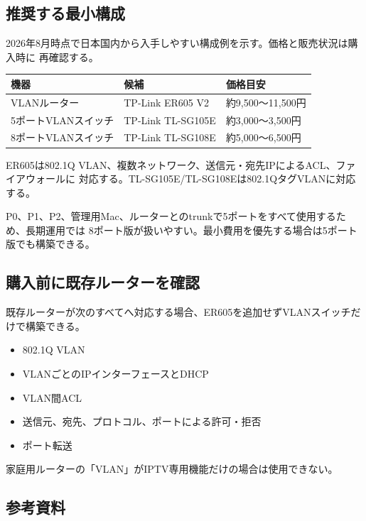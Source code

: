 \documentclass[uplatex,a4paper,11pt]{jsarticle}
\begin{document}
\subsection{推奨する最小構成}

2026年8月時点で日本国内から入手しやすい構成例を示す。価格と販売状況は購入時に
再確認する。

\begin{longtable}{@{}p{40mm}p{55mm}p{50mm}@{}}
\toprule
機器 & 候補 & 価格目安\\
\midrule
VLANルーター & TP-Link ER605 V2 & 約9,500～11,500円\\
5ポートVLANスイッチ & TP-Link TL-SG105E & 約3,000～3,500円\\
8ポートVLANスイッチ & TP-Link TL-SG108E & 約5,000～6,500円\\
\bottomrule
\end{longtable}

ER605は802.1Q VLAN、複数ネットワーク、送信元・宛先IPによるACL、ファイアウォールに
対応する。TL-SG105E/TL-SG108Eは802.1QタグVLANに対応する。

P0、P1、P2、管理用Mac、ルーターとのtrunkで5ポートをすべて使用するため、長期運用では
8ポート版が扱いやすい。最小費用を優先する場合は5ポート版でも構築できる。

\subsection{購入前に既存ルーターを確認}

既存ルーターが次のすべてへ対応する場合、ER605を追加せずVLANスイッチだけで構築できる。

\begin{itemize}
  \item 802.1Q VLAN
  \item VLANごとのIPインターフェースとDHCP
  \item VLAN間ACL
  \item 送信元、宛先、プロトコル、ポートによる許可・拒否
  \item ポート転送
\end{itemize}

家庭用ルーターの「VLAN」がIPTV専用機能だけの場合は使用できない。

\subsection{参考資料}
\end{document}
